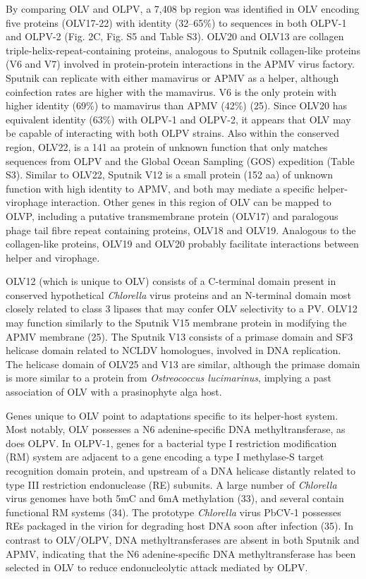 By comparing OLV and OLPV, a 7,408 bp region was identified in OLV encoding five proteins (OLV17-22) with identity (32--65\%) to sequences in both OLPV-1 and OLPV-2 (Fig. 2C, Fig. S5 and Table S3). 
OLV20 and OLV13 are collagen triple-helix-repeat-containing proteins, analogous to Sputnik collagen-like proteins (V6 and V7) involved in protein-protein interactions in the APMV virus factory. 
Sputnik can replicate with either mamavirus or APMV as a helper, although coinfection rates are higher with the mamavirus. 
V6 is the only protein with higher identity (69\%) to mamavirus than APMV (42\%) (25). 
Since OLV20 has equivalent identity (63\%) with OLPV-1 and OLPV-2, it appears that OLV may be capable of interacting with both OLPV strains. 
Also within the conserved region, OLV22, is a 141 aa protein of unknown function that only matches sequences from OLPV and the Global Ocean Sampling (GOS) expedition (Table S3). 
Similar to OLV22, Sputnik V12 is a small protein (152 aa) of unknown function with high identity to APMV, and both may mediate a specific helper-virophage interaction. 
Other genes in this region of OLV can be mapped to OLVP, including a putative transmembrane protein (OLV17) and paralogous phage tail fibre repeat containing proteins, OLV18 and OLV19. 
Analogous to the collagen-like proteins, OLV19 and OLV20 probably facilitate interactions between helper and virophage. 

OLV12 (which is unique to OLV) consists of a C-terminal domain present in conserved hypothetical \emph{Chlorella} virus proteins and an N-terminal domain most closely related to class 3 lipases that may confer OLV selectivity to a PV. 
OLV12 may function similarly to the Sputnik V15 membrane protein in modifying the APMV membrane (25). 
The Sputnik V13 consists of a primase domain and SF3 helicase domain related to NCLDV homologues, involved in DNA replication. 
The helicase domain of OLV25 and V13 are similar, although the primase domain is more similar to a protein from \emph{Ostreococcus lucimarinus}, implying a past association of OLV with a prasinophyte alga host. 

Genes unique to OLV point to adaptations specific to its helper-host system. 
Most notably, OLV possesses a N6 adenine-specific DNA methyltransferase, as does OLPV. 
In OLPV-1, genes for a bacterial type I restriction modification (RM) system are adjacent to a gene encoding a type I methylase-S target recognition domain protein, and upstream of a DNA helicase distantly related to type III restriction endonuclease (RE) subunits. 
A large number of \emph{Chlorella} virus genomes have both 5mC and 6mA methylation (33), and several contain functional RM systems (34). 
The prototype \emph{Chlorella} virus PbCV-1 possesses REs packaged in the virion for degrading host DNA soon after infection (35). 
In contrast to OLV/OLPV, DNA methyltransferases are absent in both Sputnik and APMV, indicating that the N6 adenine-specific DNA methyltransferase has been selected in OLV to reduce endonucleolytic attack mediated by OLPV. 

